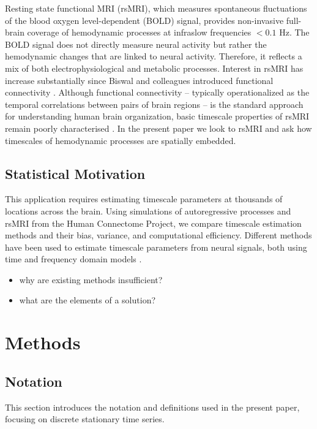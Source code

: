 \documentclass[10pt]{article}
\begin{document}
Resting state functional MRI (rsMRI), which measures spontaneous fluctuations of the blood oxygen level-dependent (BOLD) signal, provides non-invasive full-brain coverage of hemodynamic processes at infraslow frequencies $<0.1$ Hz. The BOLD signal does not directly measure neural activity but rather the hemodynamic changes that are linked to neural activity. Therefore, it reflects a mix of both electrophysiological and metabolic processes. Interest in rsMRI has increase substantially since Biswal and colleagues introduced functional connectivity \cite{biswal_functional_1995}. Although functional connectivity -- typically operationalized as the temporal correlations between pairs of brain regions -- is the standard approach for understanding human brain organization, basic timescale properties of rsMRI remain poorly characterised \cite{shinn_functional_2023}. In the present paper we look to rsMRI and ask how timescales of hemodynamic processes are spatially embedded.\\

\subsection{Statistical Motivation}
This application requires estimating timescale parameters at thousands of locations across the brain. Using simulations of autoregressive processes and rsMRI from the Human Connectome Project, we compare timescale estimation methods and their bias, variance, and computational efficiency. Different methods have been used to estimate timescale parameters from neural signals, both using time and frequency domain models \cite{gao_neuronal_2020, raut_hierarchical_2020}. 

\begin{itemize}
    \item why are existing methods insufficient?
    \item what are the elements of a solution?
\end{itemize}

\section{Methods}

\subsection{Notation}

This section introduces the notation and definitions used in the present paper, focusing on discrete stationary time series.
\end{document}
